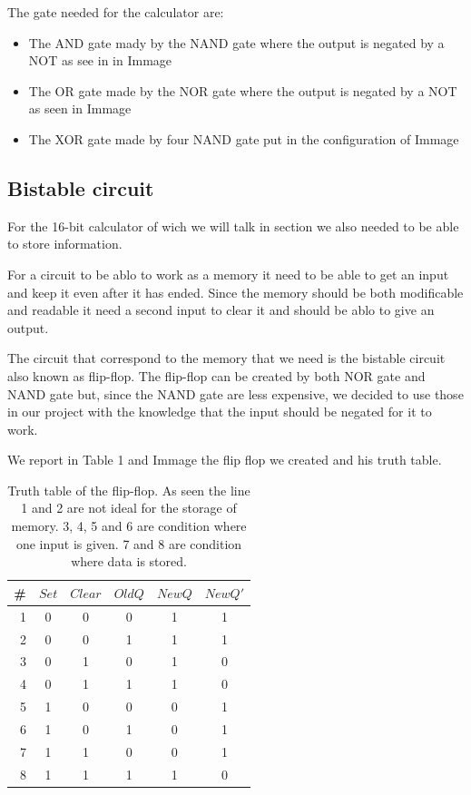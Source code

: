 \documentclass{article}
\begin{document}
The gate needed for the calculator are: 

\begin{itemize}
\item The AND gate mady by the NAND gate where the output is negated by a NOT as see in in Immage %
\item The OR gate made by the NOR gate where the output is negated by a NOT as seen in Immage %
\item The XOR gate made by four NAND gate put in the configuration of Immage %
\end{itemize}


\subsection{Bistable circuit}

For the 16-bit calculator of wich we will talk in section %
we also needed to be able to store information. 

For a circuit to be ablo to work as a memory it need to be able to get an input and keep it even after it has ended. Since the memory should be both modificable and readable it need a second input to clear it and should be ablo to give an output.

\vspace{3mm}

The circuit that correspond to the memory that we need is the bistable circuit also known as flip-flop.
The flip-flop can be created by both NOR gate and NAND gate but, since the NAND gate are less expensive, we decided to use those in our project with the knowledge that the input should be negated for it to work.

We report in Table 1 and Immage %
the flip flop we created and his truth table.


\begin{table}[h!]
\centering
\begin{tabular}{ | c | c  c  c | c  c |}
\hline
 \# & $Set$ & $Clear$ & $Old Q$ & $New Q$ & $New Q'$\\
\hline
 \ 1 & 0 & 0 & 0 & 1 & 1 \\ 
 \ 2 & 0 & 0 & 1 & 1 & 1 \\
\hline 
 \ 3 & 0 & 1 & 0 & 1 & 0 \\ 
 \ 4 & 0 & 1 & 1 & 1 & 0 \\ 
 \ 5 & 1 & 0 & 0 & 0 & 1 \\
 \ 6 & 1 & 0 & 1 & 0 & 1 \\
\hline
 \ 7 & 1 & 1 & 0 & 0 & 1 \\
 \ 8 & 1 & 1 & 1 & 1 & 0 \\ 
\hline
\end{tabular}
\caption{Truth table of the flip-flop. As seen the line 1 and 2 are not ideal for the storage of memory. 3, 4, 5 and 6 are condition where one input is given. 7 and 8 are condition where data is stored.}
\label{table:1}
\end{table}
\end{document}
